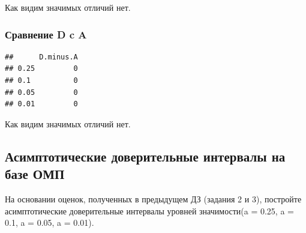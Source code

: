 \documentclass[]{article}
\begin{document}
Как видим значимых отличий нет.

\subsubsection{Сравнение D c A}\label{-d-c-a}

\begin{verbatim}
##      D.minus.A
## 0.25         0
## 0.1          0
## 0.05         0
## 0.01         0
\end{verbatim}

Как видим значимых отличий нет.

\subsection{Асимптотические доверительные интервалы на базе
ОМП}\label{-----}

На основании оценок, полученных в предыдущем ДЗ (задания 2 и 3),
постройте асимптотические доверительные интервалы уровней значимости(a =
0.25, a = 0.1, a = 0.05, a = 0.01).
\end{document}
